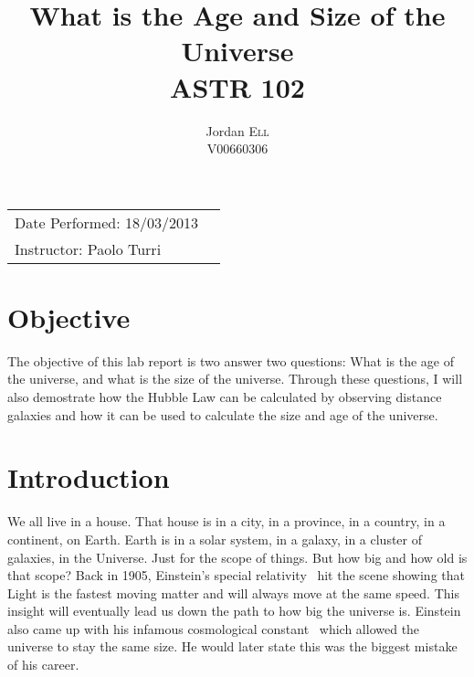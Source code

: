 \documentclass{article}
\title{What is the Age and Size of the Universe \\ ASTR 102} %
\author{Jordan \textsc{Ell} \\ V00660306} %
\begin{document}
\maketitle %

\begin{tabular}{lr}
Date Performed: 18/03/2013\\ %
Instructor: Paolo Turri %
\end{tabular}

\setlength\parindent{0pt} %

\renewcommand{\labelenumi}{\alph{enumi}.} %


\section{Objective}

The objective of this lab report is two answer two questions: What is the age of the 
universe, and what is the size of the universe. Through these questions, I will also
demostrate how the Hubble Law can be calculated by observing distance galaxies and
how it can be used to calculate the size and age of the universe.
 

\section{Introduction}

We all live in a house. That house is in a city, in a province, in a country, in a 
continent, on Earth. Earth is in a solar system, in a galaxy, in a cluster of galaxies,
in the Universe. Just for the scope of things. But how big and how old is that scope?
Back in 1905, Einstein's special relativity~\cite{alb:1905} hit the scene showing that
Light is the fastest moving matter and will always move at the same speed. This insight
will eventually lead us down the path to how big the universe is. Einstein also
came up with his infamous cosmological constant~\cite{urry:2008}
which allowed the universe to stay
the same size. He would later state this was the biggest mistake of his career.\\
\end{document}
